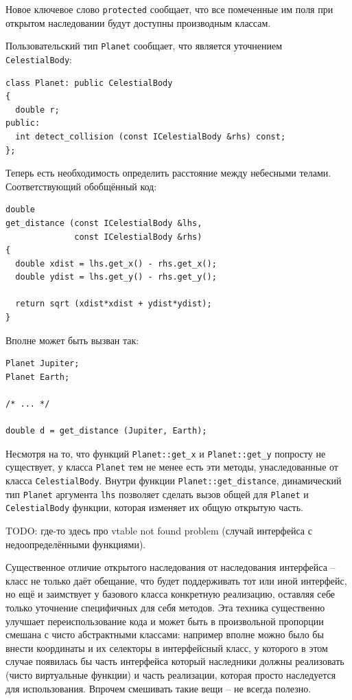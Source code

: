 \documentclass[a4paper,12pt,oneside]{book}
\begin{document}
Новое ключевое слово \lstinline!protected! сообщает, что все помеченные им поля при открытом наследовании будут доступны производным классам.

Пользовательский тип \lstinline!Planet! сообщает, что является уточнением \lstinline!CelestialBody!:

\begin{lstlisting}
class Planet: public CelestialBody
{
  double r;
public:
  int detect_collision (const ICelestialBody &rhs) const;
};
\end{lstlisting}

Теперь есть необходимость определить расстояние между небесными телами. Соответствующий обобщённый код:

\begin{lstlisting}
double 
get_distance (const ICelestialBody &lhs, 
              const ICelestialBody &rhs)
{
  double xdist = lhs.get_x() - rhs.get_x();
  double ydist = lhs.get_y() - rhs.get_y();

  return sqrt (xdist*xdist + ydist*ydist);
}
\end{lstlisting}

Вполне может быть вызван так:

\begin{lstlisting}
Planet Jupiter;
Planet Earth;

/* ... */

double d = get_distance (Jupiter, Earth);
\end{lstlisting}

Несмотря на то, что функций \lstinline!Planet::get_x! и \lstinline!Planet::get_y! попросту не существует, у класса \lstinline!Planet! тем не менее есть эти методы, унаследованные от класса \lstinline!CelestialBody!. Внутри функции \lstinline!Planet::get_distance!, динамический тип \lstinline!Planet! аргумента \lstinline!lhs! позволяет сделать вызов общей для \lstinline!Planet! и \lstinline!CelestialBody! функции, которая изменяет их общую открытую часть.

TODO: где-то здесь про vtable not found problem (случай интерфейса с недоопределёнными функциями).

Существенное отличие открытого наследования от наследования интерфейса -- класс не только даёт обещание, что будет поддерживать тот или иной интерфейс, но ещё и заимствует у базового класса конкретную реализацию, оставляя себе только уточнение специфичных для себя методов. Эта техника существенно улучшает переиспользование кода и может быть в произвольной пропорции смешана с чисто абстрактными классами: например вполне можно было бы внести координаты и их селекторы в интерфейсный класс, у которого в этом случае появилась бы часть интерфейса который наследники должны реализовать (чисто виртуальные функции) и часть реализации, которая просто наследуется для использования. Впрочем смешивать такие вещи -- не всегда полезно.
\end{document}
